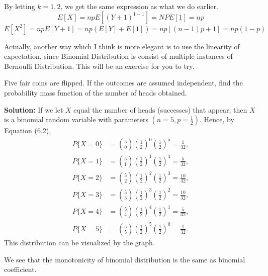 By letting $k=1, 2$, we get the same expression as what we do earlier.
\[E[X] = npE[(Y+1)^{1-1}] = NPE[1] = np\]
\[E[X^2] = npE[Y+1] = np(E[Y]+E[1]) = np[(n-1)p+1]=np(1-p)\]
\begin{remark}
    Actually, another way which I think is more elegant is to use the linearity of expectation, since Binomial Distribution is consist of multiple instances of Bernoulli Distribution. This will be an exercise for you to try.
\end{remark}
\begin{example}
    Five fair coins are flipped. If the outcomes are assumed independent, find the probability mass function of the number of heads obtained.

    \textbf{Solution:} If we let \( X \) equal the number of heads (successes) that appear, then \( X \) is a binomial random variable with parameters \( (n = 5, p = \frac{1}{2}) \). Hence, by Equation (6.2),
    \[
    \begin{aligned}
        P\{X = 0\} &= \binom{5}{0} \left( \frac{1}{2} \right)^0 \left( \frac{1}{2} \right)^5 = \frac{1}{32}, \\
        P\{X = 1\} &= \binom{5}{1} \left( \frac{1}{2} \right)^1 \left( \frac{1}{2} \right)^4 = \frac{5}{32}, \\
        P\{X = 2\} &= \binom{5}{2} \left( \frac{1}{2} \right)^2 \left( \frac{1}{2} \right)^3 = \frac{10}{32}, \\
        P\{X = 3\} &= \binom{5}{3} \left( \frac{1}{2} \right)^3 \left( \frac{1}{2} \right)^2 = \frac{10}{32}, \\
        P\{X = 4\} &= \binom{5}{4} \left( \frac{1}{2} \right)^4 \left( \frac{1}{2} \right)^1 = \frac{5}{32}, \\
        P\{X = 5\} &= \binom{5}{5} \left( \frac{1}{2} \right)^5 \left( \frac{1}{2} \right)^0 = \frac{1}{32}.
    \end{aligned}
    \]
    This distribution can be visualized by the graph.
\begin{center}
\probtable

\end{center}
We see that the monotonicity of binomial distribution is the same as binomial coefficient.
\end{example}

